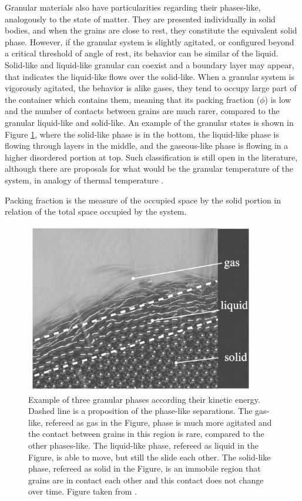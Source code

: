     Granular materials also have particularities regarding their phases-like, analogously to the state of matter. They are presented individually in solid bodies, and when the grains are close to rest, they constitute the equivalent solid phase. However, if the granular system is slightly agitated, or configured beyond a critical threshold of angle of rest, its behavior can be similar of the liquid. Solid-like and liquid-like granular can coexist and a boundary layer may appear, that indicates the liquid-like flows over the solid-like. When a granular system is vigorously agitated, the behavior is alike gases, they tend to occupy large part of the container which contains them, meaning that its packing fraction ($\phi$) is low and the number of contacts between grains are much rarer, compared to the granular liquid-like and solid-like. An example of the granular states is shown in Figure \ref{fig:exemplo_fases}, where the solid-like phase is in the bottom, the liquid-like phase is flowing through layers in the middle, and the gaseous-like phase is flowing in a higher disordered portion at top. Such classification is still open in the literature, although there are proposals for what would be the granular temperature of the system, in analogy of thermal temperature \cite{Granular_Solids_Liquids_and_Gases}.

    Packing fraction is the measure of the occupied space by the solid portion in relation of the total space occupied by the system. 

    \begin{figure}
        \centering
        \includegraphics[width=0.9\textwidth]{04-figuras/Exemplo_Fases.png}
        \caption[Granular phases.]{Example of three granular phases according their kinetic energy. Dashed line is a proposition of the phase-like separations. The gas-like, refereed as gas in the Figure, phase is much more agitated and the contact between grains in this region is rare, compared to the other phases-like. The liquid-like phase, refereed as liquid in the Figure, is able to move, but still the slide each other. The solid-like phase, refereed as solid in the Figure, is an immobile region that grains are in contact each other and this contact does not change over time. Figure taken from \cite{Granular_Media_Between_Fluid_and_Solid}.}
        \label{fig:exemplo_fases}
    \end{figure}


